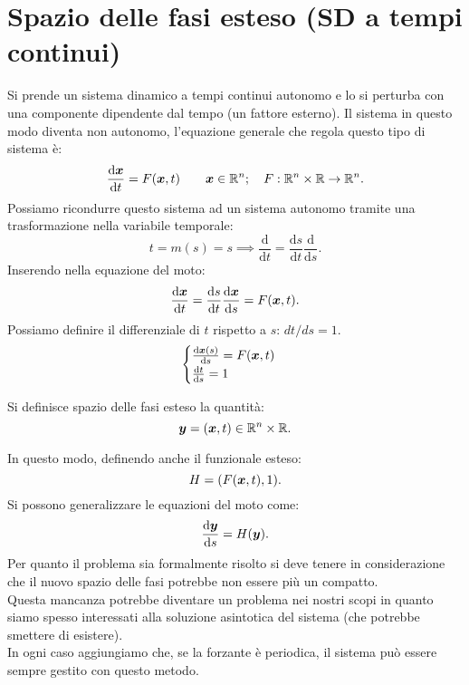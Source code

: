 \section{Spazio delle fasi esteso (SD a tempi continui)}%
\label{sub:Spazio delle fasi esteso (SD a tempi continui)}
Si prende un sistema dinamico a tempi continui autonomo e lo si perturba con una componente dipendente dal tempo (un fattore esterno). Il sistema in questo modo diventa non autonomo, l'equazione generale che regola questo tipo di sistema è:
\[
    \frac{\text{d} \boldsymbol{x}}{\text{d} t} = F(\boldsymbol{x},t) \qquad 
    \boldsymbol{x}\in \mathbb{R}^n; \quad
    F: \mathbb{R}^n \times \mathbb{R}\to \mathbb{R}^n
.\] 
Possiamo ricondurre questo sistema ad un sistema autonomo tramite una trasformazione nella variabile temporale:
\[
    t = m(s) = s \implies  \frac{\text{d} }{\text{d} t} = \frac{\text{d} s}{\text{d} t} \frac{\text{d} }{\text{d} s} 
.\] 
Inserendo nella equazione del moto:
\[
    \frac{\text{d} \boldsymbol{x}}{\text{d} t} = \frac{\text{d} s}{\text{d} t} \frac{\text{d} \boldsymbol{x}}{\text{d} s} = F(\boldsymbol{x}, t)
.\] 
Possiamo definire il differenziale di $t$  rispetto a $s$: $dt /ds = 1$.
\[
    \begin{cases}
	\frac{\text{d} \boldsymbol{x} (s)}{\text{d} s} = F(\boldsymbol{x}, t)\\
	\frac{\text{d} t}{\text{d} s} = 1
    \end{cases}
\] 
\begin{defn}
    Si definisce spazio delle fasi esteso la quantità:
    \[
	\boldsymbol{y} =(\boldsymbol{x}, t) \in \mathbb{R}^n \times \mathbb{R}
    .\] 
\end{defn}
\noindent
In questo modo, definendo anche il funzionale esteso:
\[
    H = (F(\boldsymbol{x}, t), 1)
.\] 
Si possono generalizzare le equazioni del moto come:
\[
    \frac{\text{d} \boldsymbol{y}}{\text{d} s} = H(\boldsymbol{y})
.\] 
Per quanto il problema sia formalmente risolto si deve tenere in considerazione che il nuovo spazio delle fasi potrebbe non essere più un compatto.\\
Questa mancanza potrebbe diventare un problema nei nostri scopi in quanto siamo spesso interessati alla soluzione asintotica del sistema (che potrebbe smettere di esistere).\\
In ogni caso aggiungiamo che, se la forzante è periodica, il sistema può essere sempre gestito con questo metodo.
